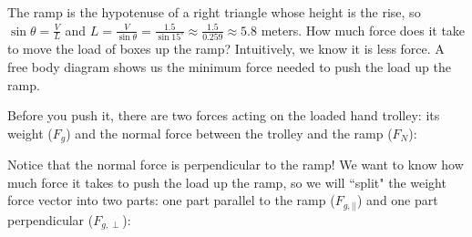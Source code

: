 The ramp is the hypotenuse of a right triangle whose height is the rise, so
$\sin\theta = \frac{V}{L}$ and $L = \frac{V}{\sin\theta} = \frac{1.5}{\sin 15^\circ}
\approx \frac{1.5}{0.259} \approx 5.8$ meters. How much force does it take to move the load of boxes 
up the ramp? Intuitively, we know it is less force. A free body diagram shows us the minimum force needed to push the load up the
ramp.

Before you push it, there are two forces acting on the loaded hand trolley: its 
weight ($F_g$) and the normal force between the trolley and the ramp ($F_N$):

\begin{center}
\end{center}

Notice that the normal force is perpendicular to the ramp! We want to know how 
much force it takes to push the load up the ramp, so we will ``split" the 
weight force vector into two parts: one part parallel to the ramp ($F_{g,\vert 
\vert}$) and one part perpendicular ($F_{g, \perp}$):


